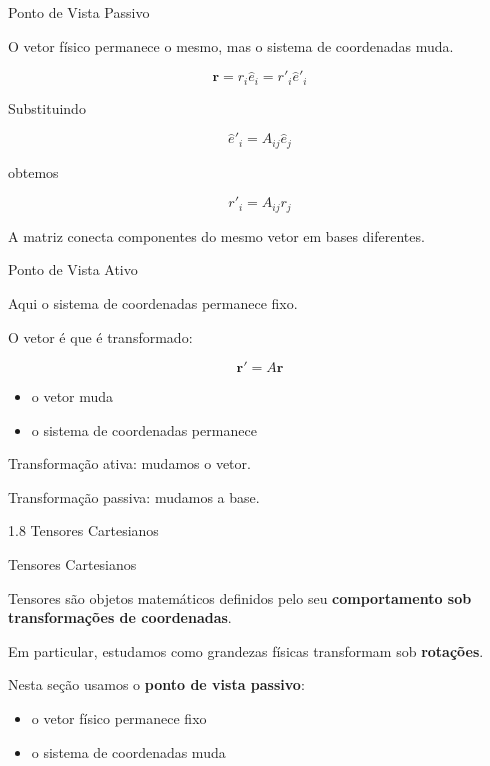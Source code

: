 \documentclass[aspectratio=169]{beamer}
\newcommand{\blue}[1]{\textcolor{myblue}{#1}}
\begin{document}
\begin{frame}{Ponto de Vista Passivo}

O vetor físico permanece o mesmo, mas o sistema de coordenadas muda.

\[
\mathbf r = r_i \hat e_i = r'_i \hat e'_i
\]

Substituindo

\[
\hat e'_i = A_{ij}\hat e_j
\]

obtemos

\begin{equation}
r'_i = A_{ij} r_j
\end{equation}

\begin{tcolorbox}[colback=blue!5,colframe=blue]
A matriz conecta componentes do mesmo vetor em bases diferentes.
\end{tcolorbox}

\end{frame}

\begin{frame}{Ponto de Vista Ativo}

Aqui o sistema de coordenadas permanece fixo.

O vetor é que é transformado:

\[
\mathbf r' = A\mathbf r
\]

\begin{itemize}
\item o vetor muda
\item o sistema de coordenadas permanece
\end{itemize}

\begin{tcolorbox}[colback=blue!5,colframe=blue]
Transformação ativa: mudamos o vetor.

Transformação passiva: mudamos a base.
\end{tcolorbox}

\end{frame}


\begin{frame}[plain]
\centering
\vfill
{\Huge\blue{1.8 Tensores Cartesianos}}
\vfill
\end{frame}


\begin{frame}{Tensores Cartesianos}

Tensores são objetos matemáticos definidos pelo seu
\textbf{comportamento sob transformações de coordenadas}.

Em particular, estudamos como grandezas físicas transformam
sob \textbf{rotações}.

Nesta seção usamos o \textbf{ponto de vista passivo}:

\begin{itemize}
\item o vetor físico permanece fixo
\item o sistema de coordenadas muda
\end{itemize}

\end{frame}
\end{document}
